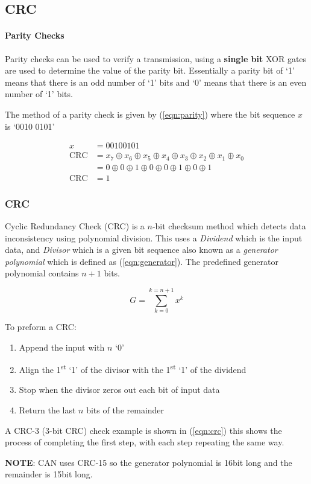 

\subsection{CRC}
\paragraph{Parity Checks} Parity checks can be used to verify a transmission, using a \textbf{single
bit} XOR gates are used to determine the value of the parity bit. Essentially a parity bit of `1'
means that there is an odd number of `1' bits and `0' means that there is an even number of `1' bits.

\noindent The method of a parity check is given by (\ref{eqn:parity}) where the bit sequence $x$ is
`0010 0101'

\begin{equation}
\begin{aligned}
    x &= 00100101\\
    \textrm{CRC} &= x_7 \oplus x_6 \oplus x_5 \oplus x_4 \oplus x_3 \oplus x_2 \oplus x_1 \oplus
    x_0\\
    &=0 \oplus 0 \oplus 1 \oplus 0 \oplus 0 \oplus 1 \oplus 0 \oplus 1\\
    \textrm{CRC} &= 1
\end{aligned}
\label{eqn:parity}
\end{equation}

\subsubsection{CRC}
Cyclic Redundancy Check (CRC) is a $n$-bit checksum method which detects data inconsistency using
polynomial division. This uses a \textit{Dividend} which is the input data, and \textit{Divisor}
which is a given bit sequence also known as a \textit{generator polynomial} which is defined as
(\ref{eqn:generator}). The predefined generator polynomial contains $n+1$ bits.

\begin{equation}
    G=\sum_{k=0}^{k=n+1} x^k
    \label{eqn:generator}
\end{equation}

To preform a CRC:

\begin{enumerate}
\item Append the input with $n$ `0'
\item Align the 1\textsuperscript{st} `1' of the divisor with the 1\textsuperscript{st} `1' of the
dividend
\item Stop when the divisor zeros out each bit of input data
\item Return the last $n$ bits of the remainder
\end{enumerate}

A CRC-3 (3-bit CRC) check example is shown in (\ref{eqn:crc}) this shows the process of completing
the first step, with each step repeating the same way.



\textbf{NOTE}: CAN uses CRC-15 so the generator polynomial is 16bit long and the remainder is 15bit
long.


